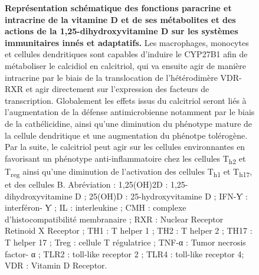 \documentclass[
  a4paper,
  DIV=11,
  numbers=noendperiod,
  listof=totoc]{scrreprt}
\begin{document}
\begin{figure}


\caption[Représentation schématique des fonctions paracrine et
intracrine de la vitamine D et de ses métabolites et des actions de la
1,25-dihydroxyvitamine D sur les systèmes immunitaires innés et
adaptatifs.]{\label{fig-vd-action}\textbf{Représentation schématique des
fonctions paracrine et intracrine de la vitamine D et de ses métabolites
et des actions de la 1,25-dihydroxyvitamine D sur les systèmes
immunitaires innés et adaptatifs.} Les macrophages, monocytes et
cellules dendritiques sont capables d'induire le \ac{CYP27B1} afin de
métaboliser le calcidiol en calcitriol, qui va ensuite agir de manière
intracrine par le biais de la translocation de l'hétérodimère
\ac{VDR}-\ac{RXR} et agir directement sur l'expression des facteurs de
transcription. Globalement les effets issus du calcitriol seront liés à
l'augmentation de la défense antimicrobienne notamment par le biais de
la cathélicidine, ainsi qu'une diminution du phénotype mature de la
cellule dendritique et une augmentation du phénotpe tolérogène. Par la
suite, le calcitriol peut agir sur les cellules environnantes en
favorisant un phénotype anti-inflammatoire chez les cellules
T\textsubscript{h2} et T\textsubscript{reg} ainsi qu'une diminution de
l'activation des cellules T\textsubscript{h1} et T\textsubscript{h17},
et des cellules B. Abréviation : 1,25(OH)2D : 1,25-dihydroxyvitamine D ;
25(OH)D : 25-hydroxyvitamine D ; IFN-Ƴ : interféron- Ƴ ; IL :
interleukine ; CMH : complexe d'histocompatibilité membranaire ; RXR :
Nuclear Receptor Retinoid X Receptor ; TH1 : T helper 1 ; TH2 : T helper
2 ; TH17 : T helper 17 ; Treg : cellule T régulatrice ; TNF-α : Tumor
necrosis factor- α ; TLR2 : toll-like receptor 2 ; TLR4 : toll-like
receptor 4; VDR : Vitamin D Receptor. \autocite{Charoenngam.2020}}

\end{figure}%
\end{document}
